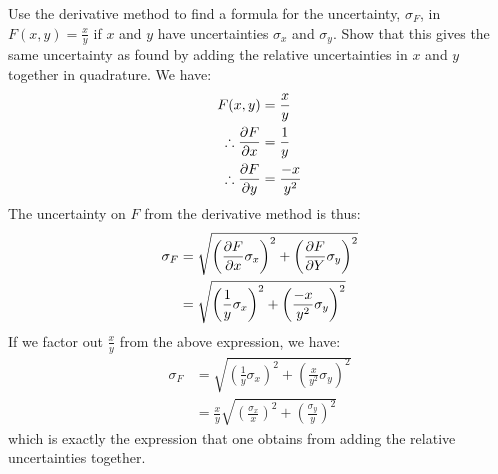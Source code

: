 \begin{example}{}{Use the derivative method to find a formula for the uncertainty, $\sigma_{F}$, in $F(x,y)=\frac{x}{y}$ if $x$ and $y$ have uncertainties $\sigma_{x}$ and $\sigma_{y}$. Show that this gives the same uncertainty as found by adding the relative uncertainties in $x$ and $y$ together in quadrature.}{}
We have:
\begin{align*}
F(x,y)&=\frac{x}{y}\\
\therefore \frac{\partial F}{\partial x}&=\frac{1}{y}\\
\therefore \frac{\partial F}{\partial y}&=\frac{-x}{y^2}
\end{align*}
The uncertainty on $F$ from the derivative method is thus:
\begin{align*}
\sigma_{F}&= \sqrt{\left(\frac{\partial F}{\partial x}\sigma_{x}\right)^2 + \left(\frac{\partial F}{\partial Y} \sigma_{y}\right)^2}\\
  &= \sqrt{\left(\frac{1}{y}\sigma_{x}\right)^2 + \left(\frac{-x}{y^2} \sigma_{y}\right)^2}\\
\end{align*}
If we factor out $\frac{x}{y}$ from the above expression, we have:
\begin{align*}
\sigma_{F}&= \sqrt{\left(\frac{1}{y}\sigma_{x}\right)^2 + \left(\frac{x}{y^2} \sigma_{y}\right)^2}\\
&=\frac{x}{y}\sqrt{\left(\frac{\sigma_{x}}{x}\right)^2 + \left(\frac{\sigma_{y}}{y} \right)^2}
\end{align*}
which is exactly the expression that one obtains from adding the relative uncertainties together. 
\end{example}

